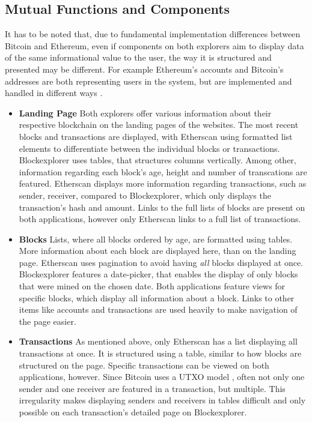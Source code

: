 \subsection{Mutual Functions and Components}
It has to be noted that, due to fundamental implementation differences between Bitcoin and Ethereum, even if components on both explorers aim to display data of the same informational value to the user, the way it is structured and presented may be different. For example Ethereum's accounts and Bitcoin's addresses are both representing users in the system, but are implemented and handled in different ways \cite{ethereum} \cite{bitcoin}.
\begin{itemize}
\item \textbf{Landing Page}
Both explorers offer various information about their respective blockchain on the landing pages of the websites. The most recent blocks and transactions are displayed, with Etherscan using formatted list elements to differentiate between the individual blocks or transactions. Blockexplorer uses tables, that structures columns vertically. Among other, information regarding each block's age, height and number of transcations are featured. Etherscan displays more information regarding transactions, such as sender, receiver, compared to Blockexplorer, which only displays the transaction's hash and amount. Links to the full lists of blocks are present on both applications, however only Etherscan links to a full list of transactions.
\item \textbf{Blocks}
Lists, where all blocks ordered by age, are formatted using tables. More information about each block are displayed here, than on the landing page. Etherscan uses pagination to avoid having \emph{all} blocks displayed at once. Blockexplorer features a date-picker, that enables the display of only blocks that were mined on the chosen date. Both applications feature views for specific blocks, which display all information about a block. Links to other items like accounts and transactions are used heavily to make navigation of the page easier.
\item \textbf{Transactions}
As mentioned above, only Etherscan has a list displaying all transactions at once. It is structured using a table, similar to how blocks are structured on the page. Specific transactions can be viewed on both applications, however. Since Bitcoin uses a UTXO model \cite{bitcoin}, often not only one sender and one receiver are featured in a transaction, but multiple. This irregularity makes displaying senders and receivers in tables difficult and only possible on each transaction's detailed page on Blockexplorer.

\end{itemize}
